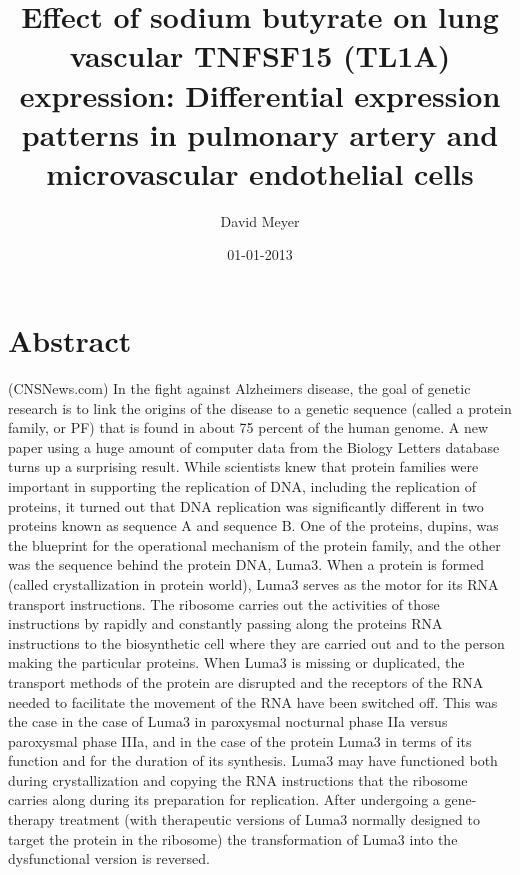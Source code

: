 \documentclass{article}%
\title{Effect of sodium butyrate on lung vascular TNFSF15 (TL1A) expression: Differential expression patterns in pulmonary artery and microvascular endothelial cells}%
\author{David Meyer}%
\affil{Institute of Bioinformatics and Biosignal Transduction, College of Bioscience and Biotechnology, National Cheng{-}Kung University, Tainan, Taiwan}%
\date{01{-}01{-}2013}%
\begin{document}
%
\normalsize%
\maketitle%
\section{Abstract}%
\label{sec:Abstract}%
(CNSNews.com)  In the fight against Alzheimers disease, the goal of genetic research is to link the origins of the disease to a genetic sequence (called a protein family, or PF) that is found in about 75 percent of the human genome.\newline%
A new paper using a huge amount of computer data from the Biology Letters database turns up a surprising result. While scientists knew that protein families were important in supporting the replication of DNA, including the replication of proteins, it turned out that DNA replication was significantly different in two proteins known as sequence A and sequence B.\newline%
One of the proteins, dupins, was the blueprint for the operational mechanism of the protein family, and the other was the sequence behind the protein DNA, Luma3.\newline%
When a protein is formed (called crystallization in protein world), Luma3 serves as the motor for its RNA transport instructions. The ribosome carries out the activities of those instructions by rapidly and constantly passing along the proteins RNA instructions to the biosynthetic cell where they are carried out and to the person making the particular proteins.\newline%
When Luma3 is missing or duplicated, the transport methods of the protein are disrupted and the receptors of the RNA needed to facilitate the movement of the RNA have been switched off.\newline%
This was the case in the case of Luma3 in paroxysmal nocturnal phase IIa versus paroxysmal phase IIIa, and in the case of the protein Luma3 in terms of its function and for the duration of its synthesis.\newline%
Luma3 may have functioned both during crystallization and copying the RNA instructions that the ribosome carries along during its preparation for replication.\newline%
After undergoing a gene{-}therapy treatment (with therapeutic versions of Luma3 normally designed to target the protein in the ribosome) the transformation of Luma3 into the dysfunctional version is reversed.\newline%
\end{document}
